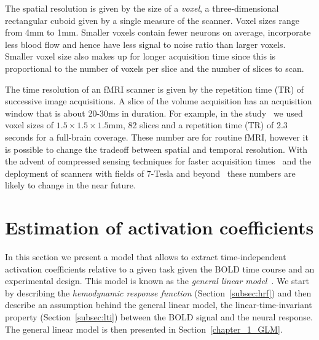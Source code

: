 The spatial resolution is given by the size of a \emph{\gls{voxel}}, a three-dimensional rectangular cuboid given by a single measure of the scanner. Voxel sizes range from 4mm to 1mm. Smaller voxels contain fewer neurons on average, incorporate less blood flow and hence have less signal to noise ratio than larger voxels. Smaller voxel size also makes up for longer acquisition time since this is proportional to the number of voxels per slice and the number of slices to scan. 

The time resolution of an fMRI scanner is given by the repetition time (\gls{TR}) of successive image acquisitions. A slice of the volume acquisition has an acquisition window that is about 20-30ms in duration. For example, in the study~\citep{borghesani:hal-00986606} we used voxel sizes of $1.5 \times 1.5 \times 1.5$mm, 82 slices and a repetition time (TR) of 2.3 seconds for a full-brain coverage. These number are for routine fMRI, however it is possible to change the tradeoff between spatial and temporal resolution. With the advent of compressed sensing techniques for faster acquisition times~\citep{MRM:MRM21391, Zong2014312, chauffertvariable} and the deployment of scanners with fields of 7-Tesla and beyond~\citep{hanke2014high} these numbers are likely to change in the near future.










\section{Estimation of activation coefficients}\label{chapter1_activation_maps}


In this section we present a model that allows to extract time-independent \gls{activation coefficient}s relative to a given task given the BOLD time course and an experimental design. This model is known as the \emph{general linear model}~\citep{Friston1995}. We start by describing the \emph{hemodynamic response function} (Section~\ref{subsec:hrf}) and then describe an assumption behind the general linear model, the linear-time-invariant property (Section~\ref{subsec:lti}) between the BOLD signal and the neural response. The general linear model is then presented in Section~\ref{chapter_1_GLM}.


